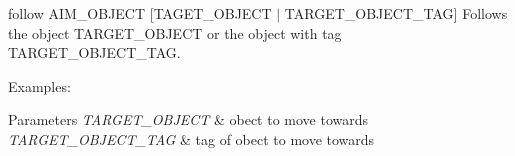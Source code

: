 follow A\+I\+M\+\_\+\+O\+B\+J\+E\+CT \mbox{[}T\+A\+G\+E\+T\+\_\+\+O\+B\+J\+E\+CT $\vert$ T\+A\+R\+G\+E\+T\+\_\+\+O\+B\+J\+E\+C\+T\+\_\+\+T\+AG\mbox{]} Follows the object T\+A\+R\+G\+E\+T\+\_\+\+O\+B\+J\+E\+CT or the object with tag T\+A\+R\+G\+E\+T\+\_\+\+O\+B\+J\+E\+C\+T\+\_\+\+T\+AG.

Examples\+:
 
\begin{DoxyParams}{Parameters}
{\em T\+A\+R\+G\+E\+T\+\_\+\+O\+B\+J\+E\+CT} & obect to move towards \\
\hline
{\em T\+A\+R\+G\+E\+T\+\_\+\+O\+B\+J\+E\+C\+T\+\_\+\+T\+AG} & tag of obect to move towards \\
\hline
\end{DoxyParams}

